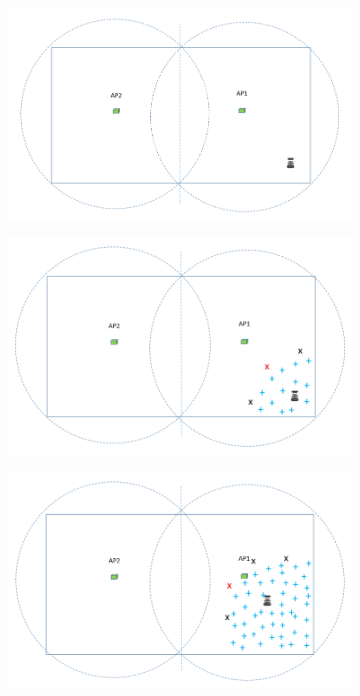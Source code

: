 \begin{figure}
    \begin{subfigure}[b]{0.495\textwidth}
		\includegraphics[width=\textwidth, height=0.6\textwidth]{images/w1.png}
		\label{subfig:a} 
		\caption{}
	\end{subfigure}
	\begin{subfigure}[b]{0.495\textwidth}
		\includegraphics[width=\textwidth, height=0.6\textwidth]{images/w2.png}
		\label{subfig:b}
		\caption{}
	\end{subfigure}
	\begin{subfigure}[b]{0.495\textwidth}
		\includegraphics[width=\textwidth, height=0.6\textwidth]{images/w3.png}

\end{subfigure}
\end{figure}
